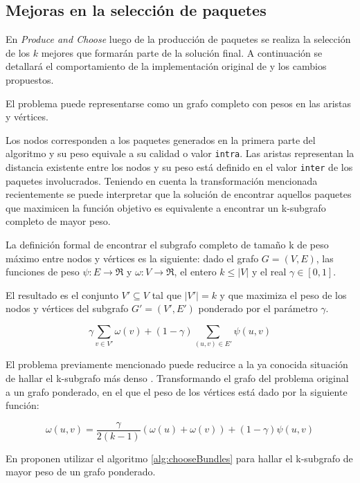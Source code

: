 \subsection{Mejoras en la selección de paquetes}
En \emph{Produce and Choose} luego de la producción de paquetes se realiza la selección de los $k$ mejores que formarán parte de la solución final. A continuación se detallará el comportamiento de la implementación original de \cite{journals/tkde/Amer-YahiaBCFMZ14} y los cambios propuestos.

El problema puede representarse como un grafo completo con pesos en las aristas y vértices. 

Los nodos corresponden a los paquetes generados en la primera parte del algoritmo y su peso equivale a su calidad o valor \texttt{intra}. Las aristas representan la distancia existente entre los nodos y su peso está definido en el valor \texttt{inter} de los paquetes involucrados. Teniendo en cuenta la transformación mencionada recientemente se puede interpretar que la solución de encontrar aquellos paquetes que maximicen la función objetivo es equivalente a encontrar un k-subgrafo completo de mayor peso.

La definición formal de encontrar el subgrafo completo de tamaño k de peso máximo entre nodos y vértices es la siguiente: dado el grafo $ G = (V,E) $, las funciones de peso $\psi : E \rightarrow \Re$ y $\omega : V \rightarrow \Re$, el entero $ k \leq |V| $ y el real $\gamma \in [0,1]$. 

El resultado es el conjunto $V' \subseteq V$ tal que $|V'| = k$ y que maximiza el peso de los nodos y vértices del subgrafo $G' = (V', E')$ ponderado por el parámetro $\gamma$.

\begin{equation}
\gamma \sum_{v \in V'}{\omega(v)} + (1 - \gamma) \sum_{(u,v) \in E'}{\psi(u,v)}
\end{equation}

El problema previamente mencionado puede reducirce a la ya conocida situación de hallar el k-subgrafo más denso \cite{DBLP:journals/algorithmica/FeigePK01}. Transformando el grafo del problema original a un grafo ponderado, en el que el peso de los vértices está dado por la siguiente función:
 
\begin{equation}
\omega(u,v) = \dfrac{\gamma}{2( k - 1)} (\omega(u) + \omega(v)) + (1 - \gamma)\psi(u,v) 
\end{equation}

En \cite{journals/tkde/Amer-YahiaBCFMZ14} proponen utilizar el algoritmo \ref{alg:chooseBundles} para hallar el k-subgrafo de mayor peso de un grafo ponderado. 

